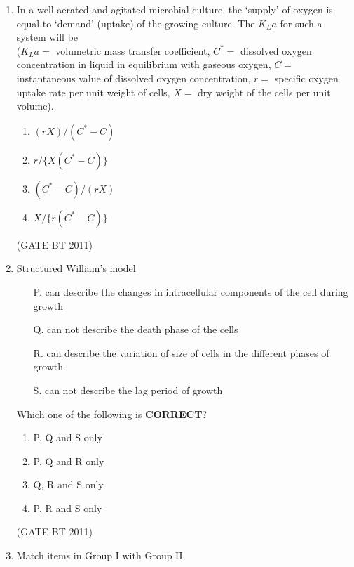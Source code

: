 \documentclass[journal,12pt,onecolumn]{IEEEtran}
\begin{document}
\begin{enumerate}
    \item In a well aerated and agitated microbial culture, the `supply' of oxygen is equal to 
    `demand' (uptake) of the growing culture. The $K_La$ for such a system will be 
    \\
    ($K_La =$ volumetric mass transfer coefficient, $C^* =$ dissolved oxygen concentration in liquid 
    in equilibrium with gaseous oxygen, $C =$ instantaneous value of dissolved oxygen concentration, 
    $r =$ specific oxygen uptake rate per unit weight of cells, $X =$ dry weight of the cells per unit volume).
    
    \begin{multicols}{2}
    \begin{enumerate}
        \item $(rX) / (C^* - C)$
        \item $r / \{ X (C^* - C) \}$
        \item $(C^* - C) / (rX)$
        \item $X / \{ r (C^* - C) \}$
    \end{enumerate}
    \end{multicols} \hfill(GATE BT 2011)
  
  \item Structured William’s model
  \begin{enumerate}
    \item[P.] can describe the changes in intracellular components of the cell during growth
    \item[Q.] can not describe the death phase of the cells
    \item[R.] can describe the variation of size of cells in the different phases of growth
    \item[S.] can not describe the lag period of growth
  \end{enumerate}

  Which one of the following is \textbf{CORRECT}?
  \begin{multicols}{2}
    \begin{enumerate}
      \item P, Q and S only
      \item P, Q and R only
      \item Q, R and S only
      \item P, R and S only
    \end{enumerate}
  \end{multicols} \hfill(GATE BT 2011)

  \item Match items in Group I with Group II.


\end{enumerate}
\end{document}
